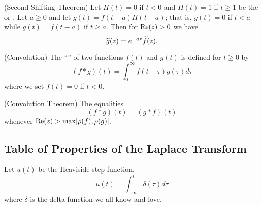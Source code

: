 \begin{thm}{(Second Shifting Theorem)}%
Let $H(t)=0$ if $t<0$ and $H(t)=1$ if $t\geq1$ be the
 or . Let
$a\geq0$ and let $g(t)=f(t-a)H(t-a)$; that is, $g(t)=0$ if $t<a$
while $g(t)=f(t-a)$ if $t\geq a$. Then for $\operatorname{Re}(z)>0$ we have
\begin{equation}%
\wt{g}(z)=e^{-az}\wt{f}(z).
\end{equation}
\end{thm}
\begin{defn}{(Convolution)}%
The ``'' of two functions $f(t)$ and $g(t)$
is defined for $t\geq0$ by
\begin{equation}%
(f*g)(t)=\int^{\infty}_{0}f(t-\tau)g(\tau)d\tau
\end{equation}
where we set $f(t)=0$ if $t<0$.
\end{defn}
\begin{thm}{(Convolution Theorem)}%
The equalities
\begin{equation}%
(f*g)(t) = (g*f)(t)
\end{equation}
whenever $\operatorname{Re}(z)>\max[\rho(f),\rho(g)]$.
\end{thm}




\subsection{Table of Properties of the Laplace Transform}
Let $u(t)$ be the Heaviside step function.
\begin{equation}%
u(t) = \int^{t}_{-\infty}\delta(\tau)d\tau
\end{equation}
where $\delta$ is the delta function we all know and love.
\\

